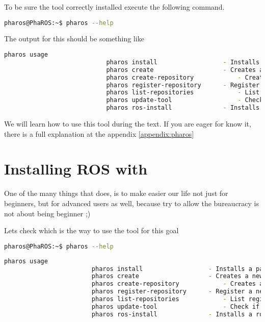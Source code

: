 \documentclass[a4paper,10pt,twoside]{book}
\begin{document}
					
					To be sure the tool correctly installed execute the following command. 
					
					\begin{lstlisting}[language=bash,title={\installationTool{} help}]
						pharos@PhaROS:~$ pharos --help
					\end{lstlisting}
					
					The output for this should be something like
					
					\begin{lstlisting}[language=bash,title={\installationTool{} help output}]
						pharos usage
							pharos install					- Installs a package 
							pharos create 					- Creates a new package based on an archetype
							pharos create-repository			- Creates a smalltalk script for creating your own repository
							pharos register-repository		- Register a new package repositry
							pharos list-repositories			- List registered repostiries
							pharos update-tool	      			- Check if there is any update of the tool, and it update it.
							pharos ros-install				- Installs a ros
					\end{lstlisting}
				 	
					
					We will learn how to use this tool during the text. If you are eager for know it, there is a full explanation at the appendix \autoref{appendix:pharos}

			\section{Installing ROS with \installationTool{}}
			
				One of the many things that \installationTool{} does, is to make easier our life not just for beginners, but for advanced users as well, because try to allow the bureaucracy is not about being beginner ;) 
				
				
				Lets check which is the way to use the tool for this goal
				
				\begin{lstlisting}[language=bash,title={\installationTool{} help}]
						pharos@PhaROS:~$ pharos --help
				\end{lstlisting}
					
				\begin{lstlisting}[language=bash,title={\installationTool{} help output}]
					pharos usage
						pharos install					- Installs a package 
						pharos create 					- Creates a new package based on an archetype
						pharos create-repository			- Creates a smalltalk script for creating your own repository
						pharos register-repository		- Register a new package repositry
						pharos list-repositories			- List registered repostiries
						pharos update-tool	      			- Check if there is any update of the tool, and it update it.
						pharos ros-install				- Installs a ros
				\end{lstlisting}
				
\end{document}

